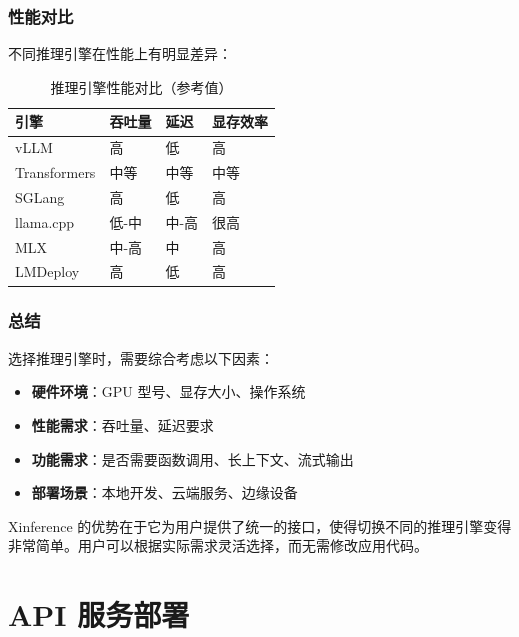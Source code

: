 \documentclass[12pt,UTF8]{ctexbook}
\begin{document}
\subsubsection{性能对比}

不同推理引擎在性能上有明显差异：

\begin{table}[htbp]
    \centering
    \caption{推理引擎性能对比（参考值）}
    \begin{tabular}{|p{2.5cm}|p{2cm}|p{2cm}|p{3cm}|}
        \hline
        \textbf{引擎} & \textbf{吞吐量} & \textbf{延迟} & \textbf{显存效率} \\
        \hline
        vLLM & 高 & 低 & 高 \\
        \hline
        Transformers & 中等 & 中等 & 中等 \\
        \hline
        SGLang & 高 & 低 & 高 \\
        \hline
        llama.cpp & 低-中 & 中-高 & 很高 \\
        \hline
        MLX & 中-高 & 中 & 高 \\
        \hline
        LMDeploy & 高 & 低 & 高 \\
        \hline
    \end{tabular}
\end{table}

\subsubsection{总结}

选择推理引擎时，需要综合考虑以下因素：

\begin{itemize}[leftmargin=2cm]
    \item \textbf{硬件环境}：GPU 型号、显存大小、操作系统
    \item \textbf{性能需求}：吞吐量、延迟要求
    \item \textbf{功能需求}：是否需要函数调用、长上下文、流式输出
    \item \textbf{部署场景}：本地开发、云端服务、边缘设备
\end{itemize}

Xinference 的优势在于它为用户提供了统一的接口，使得切换不同的推理引擎变得非常简单。用户可以根据实际需求灵活选择，而无需修改应用代码。

\section{API 服务部署}
\label{sec:api_deployment}
\end{document}
